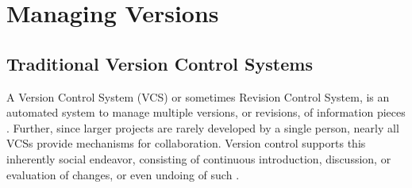 \begin{comment}
		\subitem The algorithm evaluates the matrix greedily and adds new mappings up to a maximum distance of 0.9. Thus, nodes which have nothing in common will not be connected 
		\subitem Additional mapping rules capture the domain characteristics of the processed data. Following the current specifications for SBML and CellML, we prohibit certain changes in the hierarchical tree of document nodes. Specifically, we treat parts of the model as atomic con- structs for which we define restrictions on possible network operations 
		\subitem This step is a major reason why our algorithm outperforms standard XML diff algorithms. 
		\subitem insert if an entity is present in T 2 but absent in T 
		\subitem delete if an entity is present in T 1 but absent in T 
		\subitem move if a node is present in both documents, but either (i) the parents in the corresponding trees are not connected or (ii) the parents are connected, but the sequence of their siblings has changed 
		\subitem update if the value of an attribute, a text node's content or the tag name of a node was modified
		\subitem After the mapping, we distinguish two types of nodes: mapped nodes and unmapped nodes. Unmapped nodes n 2 T 1 [ T 2 are nodes for which the algorithm could not find a matching node in the opposite tree. These nodes and their attributes correspond to either inserts or deletes, depending on their origin 
		\subitem In contrast, mapped nodes are nodes for which the algorithm did find a matching node in the opposite tree. If the parents of such a mapping of n 2 T 2 onto m 2 T 1 are not connected, or if the se- quence among their siblings has changed, then these nodes are included in the set of moves 
	\end{itemize}
	\end{comment}
	
\section{Managing Versions}
	\subsection{Traditional Version Control Systems}
	\label{sec:background:manage-versions:traditional-vcs}
	
	A Version Control System (VCS) or sometimes Revision Control System, is an automated system to manage multiple versions, or revisions, of information pieces \citep{OSullivan2009}.
	Further, since larger projects are rarely developed by a single person, nearly all VCSs provide mechanisms for collaboration. Version control supports this inherently social endeavor, consisting of continuous introduction, discussion, or evaluation of changes, or even undoing of such \citep{Collins-Sussman2004}.

